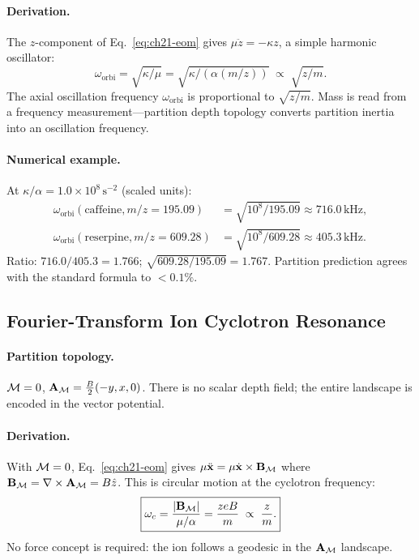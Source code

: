 \paragraph{Derivation.}
The $z$-component of Eq.~\eqref{eq:ch21-eom} gives $\mu\ddot{z} = -\kappa z$,
a simple harmonic oscillator:
\begin{equation}\label{eq:ch21-orbitrap}
  \boxed{\omega_{\mathrm{orbi}} = \sqrt{\kappa/\mu} = \sqrt{\kappa/(\alpha(m/z))}\;\propto\;\sqrt{z/m}.}
\end{equation}
The axial oscillation frequency $\omega_{\mathrm{orbi}}$ is proportional to
$\sqrt{z/m}$.  Mass is read from a frequency measurement---partition depth
topology converts partition inertia into an oscillation frequency.

\paragraph{Numerical example.}
At $\kappa/\alpha = 1.0\times 10^8\,\mathrm{s}^{-2}$ (scaled units):
\begin{align*}
  \omega_{\mathrm{orbi}}(\text{caffeine}, m/z=195.09)
    &= \sqrt{10^8/195.09} \approx 716.0\,\mathrm{kHz},\\
  \omega_{\mathrm{orbi}}(\text{reserpine}, m/z=609.28)
    &= \sqrt{10^8/609.28} \approx 405.3\,\mathrm{kHz}.
\end{align*}
Ratio: $716.0/405.3 = 1.766$; $\sqrt{609.28/195.09} = 1.767$.  Partition
prediction agrees with the standard formula to $<0.1\%$.

\subsection{Fourier-Transform Ion Cyclotron Resonance}

\paragraph{Partition topology.}
$\mathcal{M} = 0$, $\mathbf{A}_{\mathcal{M}} = \frac{B}{2}(-y, x, 0)$.  There is no scalar
depth field; the entire landscape is encoded in the vector potential.

\paragraph{Derivation.}
With $\mathcal{M} = 0$, Eq.~\eqref{eq:ch21-eom} gives $\mu\ddot{\mathbf{x}} =
\mu\dot{\mathbf{x}}\times\mathbf{B}_{\mathcal{M}}$ where $\mathbf{B}_{\mathcal{M}} =
\nabla\times\mathbf{A}_{\mathcal{M}} = B\hat{z}$.  This is circular motion at the
cyclotron frequency:
\begin{equation}\label{eq:ch21-fticr}
  \boxed{\omega_c = \frac{|\mathbf{B}_{\mathcal{M}}|}{\mu/\alpha} = \frac{zeB}{m}\;\propto\;\frac{z}{m}.}
\end{equation}
No force concept is required: the ion follows a geodesic in the $\mathbf{A}_{\mathcal{M}}$
landscape.

